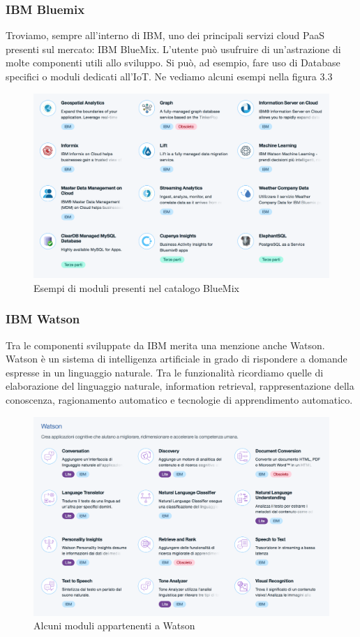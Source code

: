 \subsubsection{IBM Bluemix}
Troviamo, sempre all'interno di IBM, uno dei principali servizi cloud PaaS presenti sul mercato: IBM BlueMix. L'utente può usufruire di un'astrazione di molte componenti utili allo sviluppo. Si può, ad esempio, fare uso di Database specifici o moduli dedicati all'IoT. Ne vediamo alcuni esempi nella figura 3.3
\begin{figure}[h!]
	\centering
	\includegraphics[width=\textwidth,keepaspectratio=true]{capitoli/imgs/catalog.png}
	\caption{Esempi di moduli presenti nel catalogo BlueMix}
\end{figure}
\subsubsection{IBM Watson}
Tra le componenti sviluppate da IBM merita una menzione anche Watson. Watson è un sistema di intelligenza artificiale in grado di rispondere a domande espresse in un linguaggio naturale. Tra le funzionalità ricordiamo quelle di elaborazione del linguaggio naturale, information retrieval, rappresentazione della conoscenza, ragionamento automatico e tecnologie di apprendimento automatico.
\begin{figure}[h!]
	\centering
	\includegraphics[width=\textwidth,keepaspectratio=true]{capitoli/imgs/watson.png}
	\caption{Alcuni moduli appartenenti a Watson}
\end{figure}

